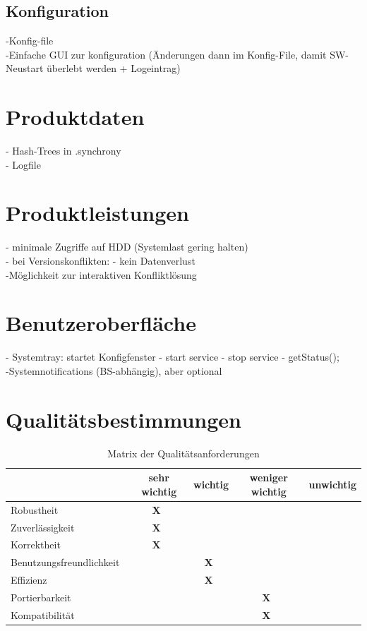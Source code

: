 \documentclass[12pt,oneside,a4paper,bibtotoc,liststotoc,pointlessnumbers]{scrartcl}
\begin{document}
\subsection{Konfiguration}
-Konfig-file\\
-Einfache GUI zur konfiguration (Änderungen dann im Konfig-File, damit SW-Neustart überlebt werden + Logeintrag)
\newpage
\section{Produktdaten}
- Hash-Trees in .synchrony\\
- Logfile
\newpage
\section{Produktleistungen}
- minimale Zugriffe auf HDD (Systemlast gering halten)\\
- bei Versionskonflikten: - kein Datenverlust\\-Möglichkeit zur interaktiven Konfliktlösung
\newpage
\section{Benutzeroberfläche}
- Systemtray: startet Konfigfenster - start service - stop service - getStatus();\\
-Systemnotifications (BS-abhängig), aber optional
\newpage
\section{Qualitätsbestimmungen}

\begin{table}[h]							
\begin{center}
 \begin{tabular}{l|c|c|c|c}
  ~ & sehr wichtig & wichtig & weniger wichtig & unwichtig\\
  \hline \hline
  Robustheit~ & \textbf{X}~ &  ~ ~ ~ &  ~ ~ ~ &  ~ ~ ~ \\
  \hline
  Zuverlässigkeit~ & \textbf{X}~ &  ~ ~ ~ &  ~ ~ ~ &  ~ ~ ~ \\
  \hline
  Korrektheit~ & \textbf{X}~ &  ~ ~ ~ &  ~ ~ ~ &  ~ ~ ~ \\
  \hline
  Benutzungsfreundlichkeit~ &  ~ ~ ~ & \textbf{X}~ &  ~ ~ ~ &  ~ ~ ~ \\
  \hline
  Effizienz~ &  ~ ~ ~ & \textbf{X}~ &  ~ ~ ~ &  ~ ~ ~ \\
  \hline
  Portierbarkeit~ &  ~ ~ ~ &  ~ ~ ~ & \textbf{X}~ &  ~ ~ ~ \\
  \hline
  Kompatibilität~ &  ~ ~ ~ &  ~ ~ ~ & \textbf{X}~ &  ~ ~ ~ \\
 \end{tabular}
\end{center}
\caption{Matrix der Qualitätsanforderungen}									%
\label{fig:LogoGD}												%
\end{table}
\end{document}

